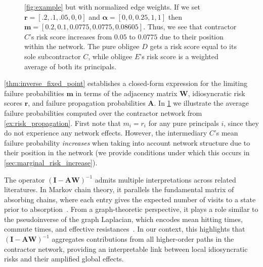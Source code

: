 \documentclass[mnsc,nonblindrev]{informs3}
\newcommand{\rvec}{\mathbf{r}}
\newcommand{\A}{\mathbf{A}}
\newcommand{\W}{\mathbf{W}}
\newcommand{\I}{\mathbf{I}}
\newcommand{\mean}{m}
\newcommand{\meanvec}{\mathbf{\mean}}
\begin{document}
\begin{figure}
    \caption{\cref{fig:example} but with normalized edge weights. If we set $\rvec = [.2,.1,.05,0,0]$ and $\mathbf{\alpha} = [0,0,0.25,1,1]$ then $\meanvec = [0.2,0.1,0.0775,0.0775,0.08605]$.  Thus, we see that contractor $C$'s risk score increases from $0.05$ to $0.0775$ due to their position within the network.  The pure obligee $D$ gets a risk score equal to its sole subcontractor $C$, while obligee $E$'s risk score is a weighted average of both its principals.}
    \label{fig:example_mean_failure}
\end{figure}

\cref{thm:inverse_fixed_point} establishes a closed-form expression for the limiting failure probabilities $\meanvec$ in terms of the adjacency matrix $\W$, idiosyncratic risk scores $\rvec$, and failure propagation probabilities $\A$.  In \cref{fig:example_mean_failure} we illustrate the average failure probabilities computed over the contractor network from \cref{ex:risk_propagation}.  First note that $\mean_i = r_i$ for any pure principals $i$, since they do not experience any network effects.  However, the intermediary $C$'s mean failure probability {\em increases} when taking into account network structure due to their position in the network (we provide conditions under which this occurs in \cref{sec:marginal_risk_increase}).

The operator $(\I - \A\W)^{-1}$ admits multiple interpretations across related literatures. In Markov chain theory, it parallels the fundamental matrix of absorbing chains, where each entry gives the expected number of visits to a state prior to absorption~\citep{kemeny1969finite}. From a graph-theoretic perspective, it plays a role similar to the pseudoinverse of the graph Laplacian, which encodes mean hitting times, commute times, and effective resistances~\citep{lovasz1993random,doyle1984random,chung1997spectral}. In our context, this highlights that $(\I - \A\W)^{-1}$ aggregates contributions from all higher-order paths in the contractor network, providing an interpretable link between local idiosyncratic risks and their amplified global effects.
\end{document}
